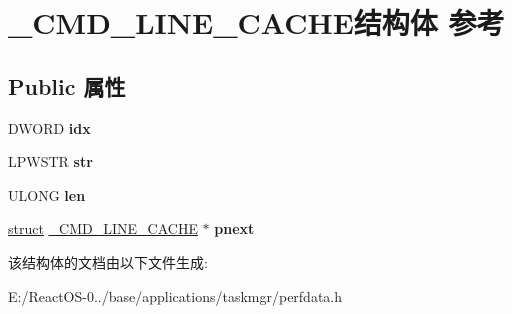 \hypertarget{struct___c_m_d___l_i_n_e___c_a_c_h_e}{}\section{\+\_\+\+C\+M\+D\+\_\+\+L\+I\+N\+E\+\_\+\+C\+A\+C\+H\+E结构体 参考}
\label{struct___c_m_d___l_i_n_e___c_a_c_h_e}
\subsection*{Public 属性}
\begin{DoxyCompactItemize}
\item 
\mbox{\label{struct___c_m_d___l_i_n_e___c_a_c_h_e_ae11f45a1fb1aebad755f462a525c40a8}} 
D\+W\+O\+RD {\bfseries idx}
\item 
\mbox{\label{struct___c_m_d___l_i_n_e___c_a_c_h_e_ae1c0999fd8375f5cfd2ea754c5e5f349}} 
L\+P\+W\+S\+TR {\bfseries str}
\item 
\mbox{\label{struct___c_m_d___l_i_n_e___c_a_c_h_e_a9df68ef6b5f545ae08f5a0f0e1b5f35d}} 
U\+L\+O\+NG {\bfseries len}
\item 
\mbox{\label{struct___c_m_d___l_i_n_e___c_a_c_h_e_a9b285cb560f054545edd82bbb748458f}} 
\hyperlink{interfacestruct}{struct} \hyperlink{struct___c_m_d___l_i_n_e___c_a_c_h_e}{\+\_\+\+C\+M\+D\+\_\+\+L\+I\+N\+E\+\_\+\+C\+A\+C\+HE} $\ast$ {\bfseries pnext}
\end{DoxyCompactItemize}


该结构体的文档由以下文件生成\+:\begin{DoxyCompactItemize}
\item 
E\+:/\+React\+O\+S-\/0../base/applications/taskmgr/perfdata.\+h\end{DoxyCompactItemize}
